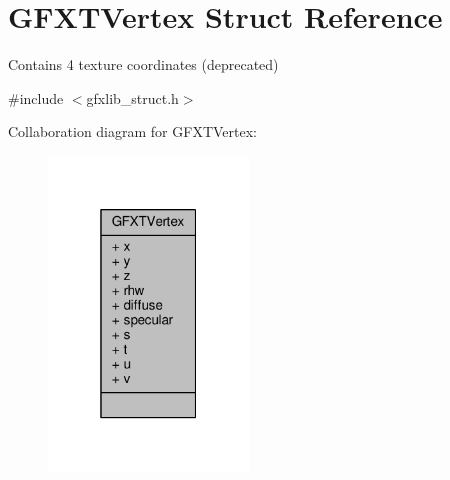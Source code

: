 \hypertarget{structGFXTVertex}{}\section{G\+F\+X\+T\+Vertex Struct Reference}
\label{structGFXTVertex}


Contains 4 texture coordinates (deprecated)  




{\ttfamily \#include $<$gfxlib\+\_\+struct.\+h$>$}



Collaboration diagram for G\+F\+X\+T\+Vertex\+:
\nopagebreak
\begin{figure}[H]
\begin{center}
\leavevmode
\includegraphics[width=151pt]{d4/d40/structGFXTVertex__coll__graph}
\end{center}
\end{figure}
